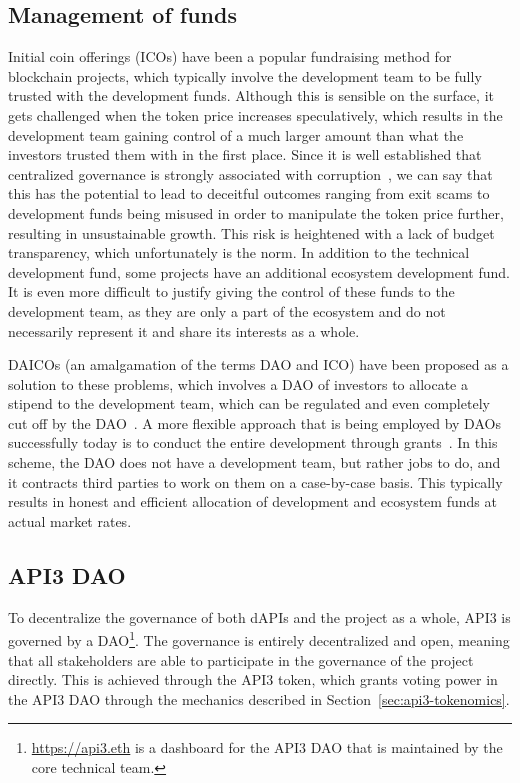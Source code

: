 \documentclass[11pt]{article}
\begin{document}
\subsection{Management of funds}
\label{sec:management-of-funds}

Initial coin offerings (ICOs) have been a popular fundraising method for blockchain projects, which typically involve the development team to be fully trusted with the development funds.
Although this is sensible on the surface, it gets challenged when the token price increases speculatively, which results in the development team gaining control of a much larger amount than what the investors trusted them with in the first place.
Since it is well established that centralized governance is strongly associated with corruption~\cite{fisman:2002}, we can say that this has the potential to lead to deceitful outcomes ranging from exit scams to development funds being misused in order to manipulate the token price further, resulting in unsustainable growth.
This risk is heightened with a lack of budget transparency, which unfortunately is the norm.
In addition to the technical development fund, some projects have an additional ecosystem development fund.
It is even more difficult to justify giving the control of these funds to the development team, as they are only a part of the ecosystem and do not necessarily represent it and share its interests as a whole.

DAICOs (an amalgamation of the terms DAO and ICO) have been proposed as a solution to these problems, which involves a DAO of investors to allocate a stipend to the development team, which can be regulated and even completely cut off by the DAO~\cite{buterin:2018}.
A more flexible approach that is being employed by DAOs successfully today is to conduct the entire development through grants~\cite{dxdao:2019}.
In this scheme, the DAO does not have a development team, but rather jobs to do, and it contracts third parties to work on them on a case-by-case basis.
This typically results in honest and efficient allocation of development and ecosystem funds at actual market rates.

\subsection{API3 DAO}
\label{sec:api3-dao}

To decentralize the governance of both dAPIs and the project as a whole, API3 is governed by a DAO\footnote{\url{https://api3.eth} is a dashboard for the API3 DAO that is maintained by the core technical team.}.
The governance is entirely decentralized and open, meaning that all stakeholders are able to participate in the governance of the project directly.
This is achieved through the API3 token, which grants voting power in the API3 DAO through the mechanics described in Section~\ref{sec:api3-tokenomics}.
\end{document}
